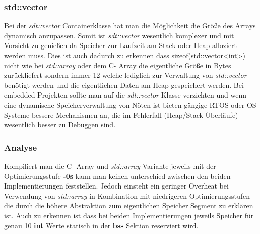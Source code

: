 \documentclass[MES,Master,ngerman]{twbook}%
\begin{document}
\begin{figure}[!htb]
	\begin{subfigure}[b]{0.5\textwidth}
		
		\label{fig:7}
	\end{subfigure}
	\begin{subfigure}[b]{0.5\textwidth}
		
		\label{fig:8}
	\end{subfigure}
\end{figure}

\subsubsection{std::vector}
Bei der \textit{sdt::vector} Containerklasse hat man die Möglichkeit die Größe des Arrays dynamisch anzupassen. Somit ist \textit{sdt::vector} wesentlich komplexer und mit Vorsicht zu genießen da Speicher zur Laufzeit am Stack oder Heap alloziert werden muss. Dies ist auch dadurch zu erkennen dass sizeof(std::vector<int>) nicht wie bei \textit{std::array} oder dem C- Array die eigentliche Größe in Bytes zurückliefert sondern immer 12 welche lediglich zur Verwaltung von \textit{std::vector} benötigt werden und die eigentlichen Daten am Heap gespeichert werden. Bei embedded Projekten sollte man auf die \textit{sdt::vector} Klasse verzichten und wenn eine dynamische Speicherverwaltung von Nöten ist bieten gängige RTOS oder OS Systeme bessere Mechanismen an, die im Fehlerfall (Heap/Stack Überläufe) wesentlich besser zu Debuggen sind.

\subsubsection{Analyse}
Kompiliert man die C- Array und \textit{std::array} Variante jeweils mit der Optimierungsstufe \textbf{-0s} kann man keinen unterschied zwischen den beiden Implementierungen feststellen. Jedoch einsteht ein geringer Overheat bei Verwendung von \textit{std::array} in Kombination mit niedrigeren Optimierungsstufen die durch die höhere Abstraktion zum eigentlichen Speicher Segment zu erklären ist. Auch zu erkennen ist dass bei beiden Implementierungen jeweils Speicher für genau 10 \textbf{int} Werte statisch in der \textbf{bss} Sektion reserviert wird.
\end{document}
